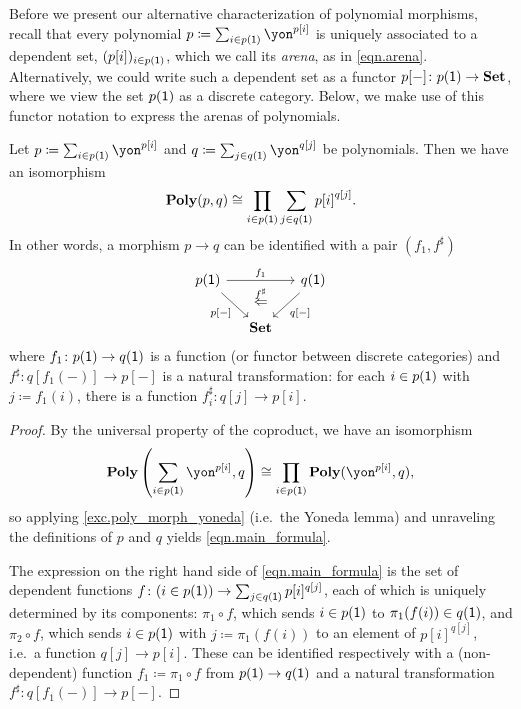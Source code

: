 \documentclass[Book-Poly]{subfiles}
\begin{document}
Before we present our alternative characterization of polynomial morphisms, recall that every polynomial $p \coloneqq \sum_{i \in p(\1)} \yon^{p[i]}$ is uniquely associated to a dependent set, $(p[i])_{i \in p(\textsf{1})}$, which we call its \emph{arena}, as in \eqref{eqn.arena}.
Alternatively, we could write such a dependent set as a functor $p[-] \colon p(\textsf{1}) \to \textbf{Set}$, where we view the set $p(\textsf{1})$ as a discrete category.
Below, we make use of this functor notation to express the arenas of polynomials.

\begin{proposition}\label{prop.poly_maps_prod_sum}
Let $p\coloneqq\sum_{i\in p(\1)}\yon^{p[i]}$ and $q\coloneqq\sum_{j\in q(\1)}\yon^{q[j]}$ be polynomials.
Then we have an isomorphism
\begin{equation}\label{eqn.main_formula}
\textbf{Poly}(p,q)\cong\prod_{i\in p(\textsf{1})}\sum_{j\in q(\textsf{1})}{p[i]}^{q[j]}.
\end{equation}
In other words, a morphism $p\to q$ can be identified with a pair $(f_1,f^\sharp)$
\begin{equation}\label{eqn.colax_poly_map}
\begin{tikzcd}[column sep=small]
	p(\1)\ar[dr, "p{[-]}"']\ar[rr, "f_1"]&~&
	q(\1)\ar[dl, "q{[-]}"]\\&
	\smset\ar[u, phantom, near end, "\overset{f^\sharp}{\Leftarrow}"]
\end{tikzcd}
\end{equation}
where $f_1 \colon p(\textsf{1}) \to q(\textsf{1})$ is a function (or functor between discrete categories) and $f^\sharp \colon q[f_1(-)] \to p[-]$ is a natural transformation: for each $i\in p(\textsf{1})$ with $j\coloneqq f_1(i)$, there is a function $f^\sharp_i\colon q[j]\to p[i]$. %
\end{proposition}
\begin{proof}
By the universal property of the coproduct, we have an isomorphism
\[
    \poly\left(\sum_{i \in p(\1)}\yon^{p[i]}, q\right) \iso \prod_{i \in p(\1)} \poly(\yon^{p[i]}, q),
\]
so applying \cref{exc.poly_morph_yoneda} (i.e.\ the Yoneda lemma) and unraveling the definitions of $p$ and $q$ yields \eqref{eqn.main_formula}.

The expression on the right hand side of \eqref{eqn.main_formula} is the set of dependent functions $f \colon (i \in p(\textsf{1})) \to \sum_{j \in q(\textsf{1})} p[i]^{q[j]}$, each of which is uniquely determined by its components: $\pi_1 \circ f$, which sends $i \in p(\textsf{1})$ to $\pi_1(f(i)) \in q(\textsf{1})$, and $\pi_2 \circ f$, which sends $i \in p(\textsf{1})$ with $j \coloneqq \pi_1(f(i))$ to an element of $p[i]^{q[j]}$, i.e.\ a function $q[j] \to p[i]$.
These can be identified respectively with a (non-dependent) function $f_1 \coloneqq \pi_1 \circ f$ from $p(\textsf{1}) \to q(\textsf{1})$ and a natural transformation $f^\sharp \colon q[f_1(-)] \to p[-]$.
\end{proof}
\end{document}
